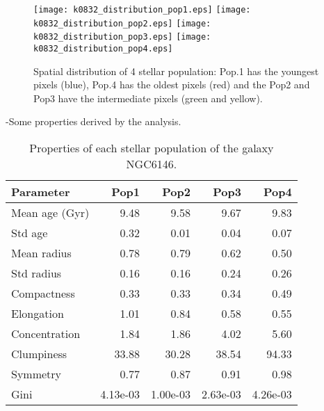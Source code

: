 \begin{figure}[bh]
\begin{center}
\texttt{[image: k0832\_distribution\_pop1.eps]}
\texttt{[image: k0832\_distribution\_pop2.eps]}
\texttt{[image: k0832\_distribution\_pop3.eps]}
\texttt{[image: k0832\_distribution\_pop4.eps]}
 \caption{Spatial distribution of 4 stellar population: Pop.1 has the youngest pixels (blue), Pop.4 has the oldest pixels (red) and the Pop2 and Pop3 have the intermediate pixels (green and yellow).}
   \label{fig1}
\end{center}
\end{figure}



-Some properties derived by the analysis.


\begin{table}[h]
\centering
\begin{tabular}{l|r|r|r|r}
Parameter & Pop1 & Pop2 & Pop3 & Pop4 \\\hline
Mean age (Gyr) & 9.48 & 9.58 & 9.67 & 9.83 \\
Std age & 0.32 & 0.01 & 0.04 & 0.07 \\
Mean radius & 0.78 & 0.79 & 0.62 & 0.50 \\
Std radius & 0.16 &  0.16 & 0.24 & 0.26 \\
Compactness & 0.33 & 0.33 & 0.34 & 0.49 \\
Elongation & 1.01 & 0.84 & 0.58 & 0.55 \\
Concentration & 1.84 & 1.86 & 4.02 & 5.60 \\
Clumpiness & 33.88 & 30.28 & 38.54 & 94.33 \\
Symmetry & 0.77 & 0.87 & 0.91 & 0.98 \\
Gini & 4.13e-03 & 1.00e-03 & 2.63e-03 & 4.26e-03 \\
\end{tabular}
\caption{\label{tab:widgets}Properties of each stellar population of the galaxy NGC6146.}
\end{table}




